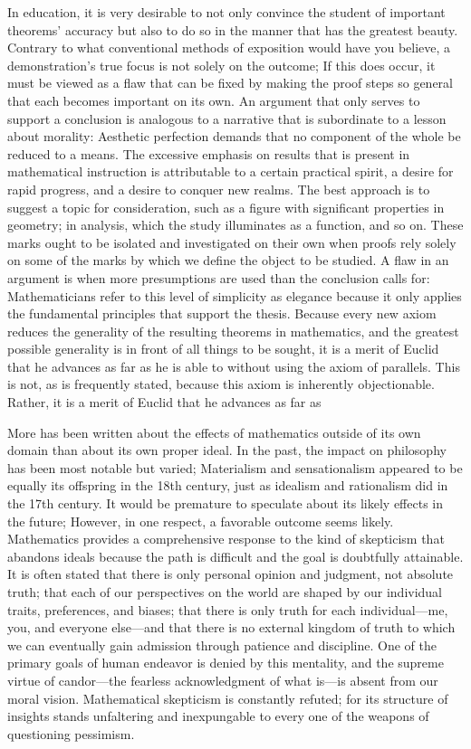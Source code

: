 \documentclass[a4paper,12pt]{book}[2004/02/16]
\theoremstyle{ilemma}
\theoremstyle{itheorem}
\theoremstyle{iother}
\theoremstyle{icorollary}
\theoremstyle{numcorollary}
\theoremstyle{idefinition}
\begin{document}
In education, it is very desirable to not only convince the student of important theorems' accuracy but also to do so in the manner that has the greatest beauty. Contrary to what conventional methods of exposition would have you believe, a demonstration's true focus is not solely on the outcome; If this does occur, it must be viewed as a flaw that can be fixed by making the proof steps so general that each becomes important on its own. An argument that only serves to support a conclusion is analogous to a narrative that is subordinate to a lesson about morality:
Aesthetic perfection demands that no component of the whole be reduced to a means.
The excessive emphasis on results that is present in mathematical instruction is attributable to a certain practical spirit, a desire for rapid progress, and a desire to conquer new realms. The best approach is to suggest a topic for consideration, such as a figure with significant properties in geometry; in analysis, which the study illuminates as a function, and so on. These marks ought to be isolated and investigated on their own when proofs rely solely on some of the marks by which we define the object to be studied. A flaw in an argument is when more presumptions are used than the conclusion calls for:
Mathematicians refer to this level of simplicity as elegance because it only applies the fundamental principles that support the thesis. Because every new axiom reduces the generality of the resulting theorems in mathematics, and the greatest possible generality is in front of all things to be sought, it is a merit of Euclid that he advances as far as he is able to without using the axiom of parallels. This is not, as is frequently stated, because this axiom is inherently objectionable. Rather, it is a merit of Euclid that he advances as far as

More has been written about the effects of mathematics outside of its own domain than about its own proper ideal. In the past, the impact on philosophy has been most notable but varied; Materialism and sensationalism appeared to be equally its offspring in the 18th century, just as idealism and rationalism did in the 17th century. It would be premature to speculate about its likely effects in the future; However, in one respect, a favorable outcome seems likely.
Mathematics provides a comprehensive response to the kind of skepticism that abandons ideals because the path is difficult and the goal is doubtfully attainable. It is often stated that there is only personal opinion and judgment, not absolute truth; that each of our perspectives on the world are shaped by our individual traits, preferences, and biases; that there is only truth for each individual—me, you, and everyone else—and that there is no external kingdom of truth to which we can eventually gain admission through patience and discipline. One of the primary goals of human endeavor is denied by this mentality, and the supreme virtue of candor—the fearless acknowledgment of what is—is absent from our moral vision. Mathematical skepticism is constantly refuted; for its structure of
insights stands unfaltering and inexpungable to every one of the weapons of
questioning pessimism.
\end{document}
